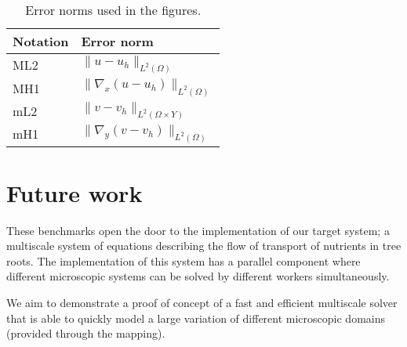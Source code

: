 \documentclass{article}
\begin{document}
\begin{table}[h!]
    \centering
\begin{tabular}{l|l}
Notation & Error norm                             \\ \hline
ML2      & $\|u - u_h\|_{L^2(\Omega)}$            \\
MH1      & $\|\nabla_x (u - u_h)\|_{L^2(\Omega)}$ \\
mL2      & $\|v - v_h\|_{L^2(\Omega \times Y)}$   \\
mH1      & $\|\nabla_y (v - v_h)\|_{L^2(\Omega)}$
\end{tabular}
\label{tab:errors}
\caption{Error norms used in the figures.}
\end{table}

\section{Future work}
\label{sec:next}
These benchmarks open the door to the implementation of our target system; a multiscale system of equations describing the flow of transport of nutrients in tree roots. The implementation of this system has a parallel component where different microscopic systems can be solved by different workers simultaneously.

We aim to demonstrate a proof of concept of a fast and efficient multiscale solver that is able to quickly model a large variation of different microscopic domains (provided through the mapping).
\end{document}
